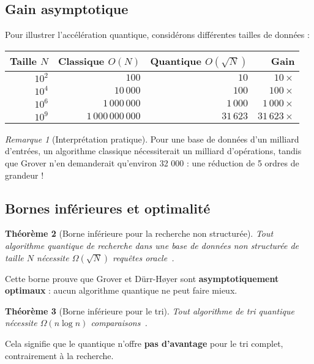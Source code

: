 \documentclass[12pt,a4paper]{article}
\newtheorem{theorem}{Théorème}[section]
\theoremstyle{definition}
\theoremstyle{remark}
\newtheorem{remark}[theorem]{Remarque}
\begin{document}
\subsection{Gain asymptotique}

Pour illustrer l'accélération quantique, considérons différentes tailles de données :

\begin{center}
\begin{tabular}{|r|r|r|r|}
\hline
\textbf{Taille} $N$ & \textbf{Classique} $O(N)$ & \textbf{Quantique} $O(\sqrt{N})$ & \textbf{Gain} \\
\hline
$10^2$ & $100$ & $10$ & $10\times$ \\
$10^4$ & $10\,000$ & $100$ & $100\times$ \\
$10^6$ & $1\,000\,000$ & $1\,000$ & $1\,000\times$ \\
$10^9$ & $1\,000\,000\,000$ & $31\,623$ & $31\,623\times$ \\
\hline
\end{tabular}
\end{center}

\begin{remark}[Interprétation pratique]
Pour une base de données d'un milliard d'entrées, un algorithme classique nécessiterait un milliard d'opérations, tandis que Grover n'en demanderait qu'environ 32 000 : une réduction de 5 ordres de grandeur !
\end{remark}

\subsection{Bornes inférieures et optimalité}

\begin{theorem}[Borne inférieure pour la recherche non structurée]
Tout algorithme quantique de recherche dans une base de données non structurée de taille $N$ nécessite $\Omega(\sqrt{N})$ requêtes oracle~\cite{bennett1997}.
\end{theorem}

Cette borne prouve que Grover et Dürr-Høyer sont \textbf{asymptotiquement optimaux} : aucun algorithme quantique ne peut faire mieux.

\begin{theorem}[Borne inférieure pour le tri]
Tout algorithme de tri quantique nécessite $\Omega(n \log n)$ comparaisons~\cite{hoyer2000quantum}.
\end{theorem}

Cela signifie que le quantique n'offre \textbf{pas d'avantage} pour le tri complet, contrairement à la recherche.
\end{document}
